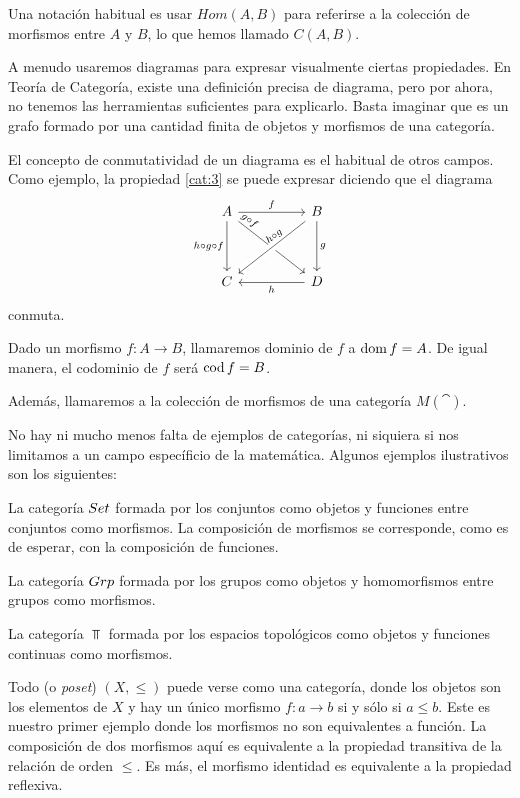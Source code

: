 Una notación habitual es usar $Hom(A,B)$ para referirse a la colección de morfismos entre $A$ y $B$, lo que hemos llamado $C(A,B)$.

A menudo usaremos diagramas para expresar visualmente ciertas propiedades.
En Teoría de Categoría, existe una definición precisa de diagrama, pero por ahora, no tenemos las herramientas suficientes para explicarlo.
Basta imaginar que es un grafo formado por una cantidad finita de objetos y morfismos de una categoría.

El concepto de conmutatividad de un diagrama es el habitual de otros campos.
Como ejemplo, la propiedad \eqref{cat:3} se puede expresar diciendo que el diagrama
\[
\begin{tikzcd}
A \arrow[rr,"f"]\arrow[rrdd,pos=0.1,"g \circ f" sloped] \arrow[dd,"h\circ g \circ f" left] & & B \arrow[lldd,pos=0.4,"h\circ g" sloped, crossing over] \arrow[dd,"g"]\\
&\\
C & & D \arrow[ll,"h"]
\end{tikzcd}
\]
conmuta.

Dado un morfismo $f \colon A \to B$, llamaremos dominio de $f$ a $\operatorname{dom} f = A$.
De igual manera, el codominio de $f$ será $\operatorname{cod} f = B$.

Además, llamaremos a la colección de morfismos de una categoría $M(\cat)$.

No hay ni mucho menos falta de ejemplos de categorías, ni siquiera si nos limitamos a un campo específicio de la matemática.
Algunos ejemplos ilustrativos son los siguientes:

\begin{example}
La categoría ${Set}$ formada por los conjuntos como objetos y funciones entre conjuntos como morfismos.
La composición de morfismos se corresponde, como es de esperar, con la composición de funciones.
\end{example}

\begin{example}
La categoría ${Grp}$ formada por los grupos como objetos y homomorfismos entre grupos como morfismos.
\end{example}

\begin{example}
La categoría $\Top$ formada por los espacios topológicos como objetos y funciones continuas como morfismos.
\end{example}

\begin{example}
Todo  (o \emph{poset}) $(X,\leq)$ puede verse como una categoría, donde los objetos son los elementos de $X$ y hay un único morfismo $f \colon a \to b$ si y sólo si $a \leq b$.
Este es nuestro primer ejemplo donde los morfismos no son equivalentes a función.
La composición de dos morfismos aquí es equivalente a la propiedad transitiva de la relación de orden $\leq$.
Es más, el morfismo identidad es equivalente a la propiedad reflexiva.
\end{example}

